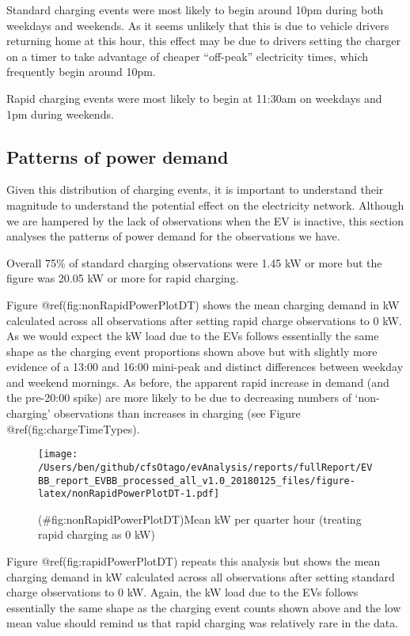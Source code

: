 \documentclass[]{article}
\begin{document}
Standard charging events were most likely to begin around 10pm during both weekdays and weekends. As it seems unlikely that this is due to vehicle drivers returning home at this hour, this effect may be due to drivers setting the charger on a timer to take advantage of cheaper ``off-peak'' electricity times, which frequently begin around 10pm.

Rapid charging events were most likely to begin at 11:30am on weekdays and 1pm during weekends.

\hypertarget{patterns-of-power-demand}{%
\subsection{Patterns of power demand}\label{patterns-of-power-demand}}

Given this distribution of charging events, it is important to understand their magnitude to understand the potential effect on the electricity network. Although we are hampered by the lack of observations when the EV is inactive, this section analyses the patterns of power demand for the observations we have.

Overall 75\% of standard charging observations were 1.45 kW or more but the figure was 20.05 kW or more for rapid charging.

Figure @ref(fig:nonRapidPowerPlotDT) shows the mean charging demand in kW calculated across all observations after setting rapid charge observations to 0 kW. As we would expect the kW load due to the EVs follows essentially the same shape as the charging event proportions shown above but with slightly more evidence of a 13:00 and 16:00 mini-peak and distinct differences between weekday and weekend mornings. As before, the apparent rapid increase in demand (and the pre-20:00 spike) are more likely to be due to decreasing numbers of `non-charging' observations than increases in charging (see Figure @ref(fig:chargeTimeTypes).

\begin{figure}
\centering
\texttt{[image: /Users/ben/github/cfsOtago/evAnalysis/reports/fullReport/EVBB\_report\_EVBB\_processed\_all\_v1.0\_20180125\_files/figure-latex/nonRapidPowerPlotDT-1.pdf]}
\caption{(\#fig:nonRapidPowerPlotDT)Mean kW per quarter hour (treating rapid charging as 0 kW)}
\end{figure}

Figure @ref(fig:rapidPowerPlotDT) repeats this analysis but shows the mean charging demand in kW calculated across all observations after setting standard charge observations to 0 kW. Again, the kW load due to the EVs follows essentially the same shape as the charging event counts shown above and the low mean value should remind us that rapid charging was relatively rare in the data.
\end{document}

